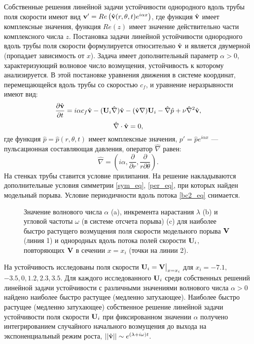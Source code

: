 Собственные решения линейной задачи устойчивости однородного вдоль трубы поля скорости имеют вид $\mathbf{v}' = Re\left(\hat {\mathbf{v}} (r, \theta, t) e^{i \alpha x}\right)$, где функция $\hat {\mathbf{v}}$ имеет комплексные значения, функция $Re(z)$ имеет значение действительно части комплексного числа $z$. Постановка задачи линейной устойчивости однородного вдоль трубы поля скорости формулируется относительно $\hat {\mathbf{v}}$ и является двумерной (пропадает зависимость от $x$). Задача имеет дополнительный параметр $\alpha > 0$, характеризующий волновое число возмущения, устойчивость к которому анализируется. В этой постановке уравнения движения в системе координат, перемещающейся вдоль трубы со скоростью $c_f$, и уравнение неразрывности имеют вид: 
\begin{equation*}
\frac{\partial \hat {\mathbf{v}}}{\partial t} = i \alpha  c_f \hat {\mathbf{v}} - (\mathbf{U}_i \hat \nabla) \hat {\mathbf{v}} - (\hat {\mathbf{v}} \nabla) \mathbf{U}_i - \hat \nabla \hat p + \nu \hat \nabla^2 \hat {\mathbf{v}},
\end{equation*}
\begin{equation*}
\hat \nabla \cdot \hat {\mathbf{v}} = 0,
\end{equation*}
где функция $\hat p = \hat p(r,\theta,t)$ имеет комплексные значения, $p' = \hat p e^{i \alpha x}$ --- пульсационная составляющая давления, оператор $\hat \nabla$ равен: 
\begin{equation*}
\hat \nabla = \left( i\alpha, \frac{\partial}{\partial r}, \frac{\partial}{r \partial \theta} \right).
\end{equation*}
На стенках трубы ставится условие прилипания. На решение накладываются дополнительные условия симметрии \eqref{sym_eq}, \eqref{per_eq}, при которых найден модельный порыва. Условие периодичности вдоль потока \eqref{bc2_eq} снимается. 

\begin{figure}
\caption{Значение волнового числа $\alpha$ (a), инкремента нарастания $\lambda$ (b) и угловой частоты $\omega$ (в системе отсчета порыва) (c) для наиболее быстро растущего возмущения поля скорости модельного порыва $\mathbf{V}$ (линия 1) и однородных вдоль потока полей скорости $\mathbf{U}_i$, повторяющих $\mathbf{V}$ в сечении $x = x_i$ (точки на линии 2).}
\label{cs_lin_pic}
\end{figure}

На устойчивость исследованы поля скорости $\mathbf{U}_i = \mathbf{V}\big|_{x=x_i}$ для $x_i = -7.1,$ $-3.5, 0, 1.2, 2.3, 3.5$.  Для каждого исследованного $\mathbf{U}_i$ среди собственных решений линейной задачи устойчивости с различными значениями волнового числа $\alpha >0$ найдено наиболее быстро растущее (медленно затухающее). Наиболее быстро растущее (медленно затухающее) собственное решение линейной задачи устойчивости поля скорости $\mathbf{U}_i$ при фиксированном значении $\alpha$ получено интегрированием случайного начального возмущения до выхода на экспоненциальный режим роста, $||\hat {\mathbf{v}}|| \sim e^{(\lambda + i\omega) t}$. 

